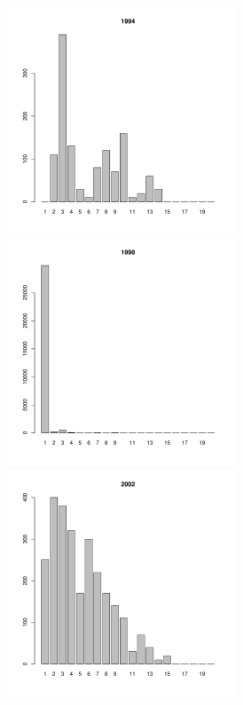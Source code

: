 \begin{figure}[h]
\begin{multicols}{3}
\hfill
\includegraphics[width=60mm]{../White_Sea/Luvenga_Goreliy/high_1994_.pdf}
\hfill
\includegraphics[width=60mm]{../White_Sea/Luvenga_Goreliy/high_1998_.pdf}
\hfill
\includegraphics[width=60mm]{../White_Sea/Luvenga_Goreliy/high_2002_.pdf}
\end{multicols}



\end{figure}

